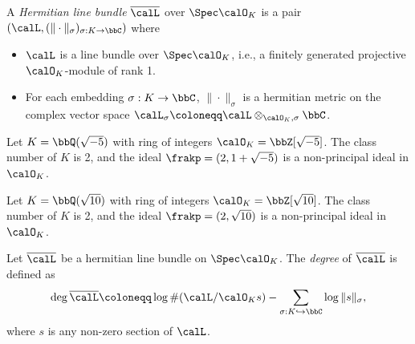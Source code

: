     \begin{definition}\label{def:hermitian_line_bundles_over_rings_of_integers}
        A \emph{Hermitian line bundle} \(\overline{\calL}\) over \(\Spec \calO_K\) is a pair \((\calL, (\|\cdot\|_\sigma)_{\sigma: K \to \bbC})\) where
        \begin{itemize}
            \item \(\calL\) is a line bundle over \(\Spec \calO_K\), i.e., a finitely generated projective \(\calO_K\)-module of rank 1.
            \item For each embedding \(\sigma: K \to \bbC\), \(\|\cdot\|_\sigma\) is a hermitian metric on the complex vector space \(\calL_\sigma \coloneqq \calL \otimes_{\calO_K, \sigma} \bbC\).
        \end{itemize}
    \end{definition}

    \begin{example}\label{eg:hermitian_line_bundle_on_Q_sqrt_minus_5}
        Let \(K = \bbQ(\sqrt{-5})\) with ring of integers \(\calO_K = \bbZ[\sqrt{-5}]\).
        The class number of \(K\) is 2, and the ideal \(\frakp = (2, 1 + \sqrt{-5})\) is a non-principal ideal in \(\calO_K\).

        \Yang{}
        
    \end{example}

    \begin{example}\label{eg:hermitian_line_bundle_on_Q_sqrt_10}
        Let \(K = \bbQ(\sqrt{10})\) with ring of integers \(\calO_K = \bbZ[\sqrt{10}]\).
        The class number of \(K\) is 2, and the ideal \(\frakp = (2, \sqrt{10})\) is a non-principal ideal in \(\calO_K\).

    \end{example}

    \begin{definition}\label{def:arithmetic_degree_of_hermitian_line_bundles}
        Let \(\overline{\calL}\) be a hermitian line bundle on \(\Spec \calO_K\). 
        The \emph{degree} of \(\overline{\calL}\) is defined as
        \[
            \deg \overline{\calL} \coloneqq \log \#(\calL / \calO_K s) - \sum_{\sigma: K \hookrightarrow \bbC} \log \|s\|_\sigma,
        \]
        where \(s\) is any non-zero section of \(\calL\).
    \end{definition}

